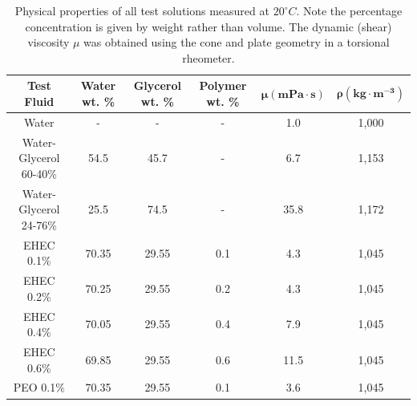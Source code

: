 \documentclass[11pt]{article}
\begin{document}
\begin{table}[t]
\begin{center}
	\begin{tabular}{|c|c|c|c|c|c|} \hline
		\textbf{Test Fluid} & \textbf{Water wt. \%} & \textbf{Glycerol wt. \%} 
& \textbf{Polymer wt. \%} & $\mathbf{\mu \left(mPa\cdot s\right)}$ & 
$\mathbf{\rho \left( kg\cdot m^{-3} \right)}$  \\ \hline 
		Water & - & - &  - & 1.0 & 1,000 \\ 
		Water-Glycerol 60-40\% & 54.5 & 45.7 & - & 6.7 & 1,153 \\ 
		Water-Glycerol 24-76\% & 25.5 & 74.5 & - & 35.8 & 1,172  \\
		EHEC 0.1\% & 70.35 & 29.55 & 0.1 & 4.3 & 1,045 \\
		EHEC 0.2\% & 70.25 & 29.55 & 0.2 & 4.3 & 1,045  \\
		EHEC 0.4\% & 70.05 & 29.55 & 0.4 & 7.9 & 1,045  \\
		EHEC 0.6\% & 69.85 & 29.55 & 0.6 & 11.5 & 1,045 \\
		PEO 0.1\% & 70.35 & 29.55 & 0.1 & 3.6 & 1,045 \\ \hline
	\end{tabular}
	\label{tbl:fluid_prop}
	\caption{Physical properties of all test solutions measured at $20^\circ C$. 
Note the percentage concentration is given by weight rather than volume. The 
dynamic (shear) viscosity $\mu$ was obtained using the cone and plate geometry 
in a torsional rheometer.}
\end{center}	
\end{table}
\end{document}
